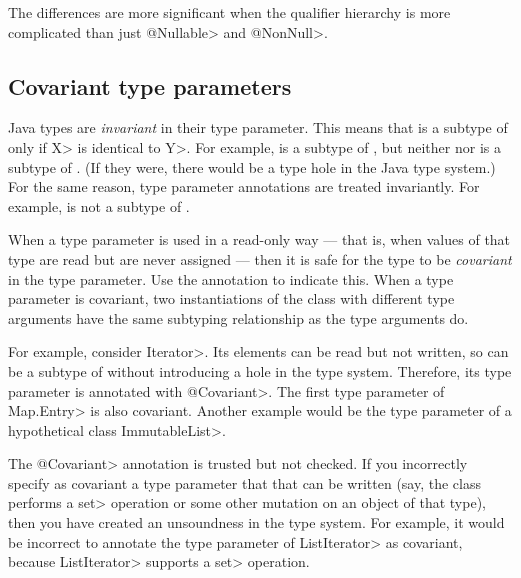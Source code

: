 The differences are more
significant when the qualifier hierarchy is more complicated than just
\<@Nullable> and \<@NonNull>.

\subsection{Covariant type parameters\label{covariant-type-parameters}}

Java types are \emph{invariant} in their type parameter.  This means that
 is a subtype of  only if \<X> is identical to \<Y>.  For
example,  is a subtype of , but
neither  nor  is a subtype of
.  (If they were, there would be a type hole in the Java
type system.)  For the same reason, type parameter annotations are treated
invariantly.  For example,  is not a subtype
of .

When a type parameter is used in a read-only way --- that is, when values
of that type are read but are never assigned --- then it is safe for the
type to be \emph{covariant} in the type parameter.  Use the  annotation to indicate
this.
When a type parameter is covariant, two instantiations of the class with
different type arguments have the same subtyping relationship as the type
arguments do.

For example, consider \<Iterator>.  Its elements can be read but not
written, so  can be a subtype of
 without introducing a hole in the type system.
Therefore, its type parameter is annotated with \<@Covariant>.
The first type parameter of \<Map.Entry> is also covariant.
Another example would be the type parameter of a hypothetical class
\<ImmutableList>. 

The \<@Covariant> annotation is trusted but not checked.
If you incorrectly specify as covariant a type parameter that that can be
written (say, the class performs a
\<set> operation or some other mutation on an object of that type), then
you have created an unsoundness in the type system.
For example, it would be incorrect to annotate the type parameter of
\<ListIterator> as covariant, because \<ListIterator> supports a \<set>
operation.


